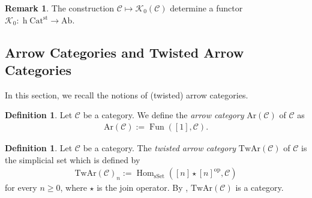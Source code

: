 \documentclass[a4paper,dvipdfmx,11pt,reqno]{amsart}
\DeclareMathOperator{\Hom}{Hom}
\DeclareMathOperator{\Map}{Map}
\DeclareMathOperator{\myop}{op}
\DeclareMathOperator{\h}{h}
\DeclareMathOperator{\Fun}{Fun}
\newcommand{\C}{\mathcal{C}}
\newcommand{\K}{\mathcal{K}}
\newcommand{\An}{\mathrm{An}}
\newcommand{\Catst}{\mathrm{Cat^{st}}}
\newcommand{\Ar}{\mathrm{Ar}}
\newcommand{\TwAr}{\mathrm{TwAr}}
\theoremstyle{definition}
\newtheorem{definition}[theorem]{Definition}
\newtheorem{remark}[theorem]{Remark}
\begin{document}
\begin{remark} \label{Ber.rem.2.5}
  The construction $\C \mapsto \K_0(\C)$ determine a functor $\K_0 : \h\Catst \to \mathrm{Ab}$.
\end{remark}

\subsection{Arrow Categories and Twisted Arrow Categories} 

In this section, we recall the notions of (twisted) arrow categories.

\begin{definition}
  Let $\C$ be a category.
  We define the \textit{arrow category} $\Ar(\C)$ of $\C$ as 
  \begin{align*}
    \Ar(\C) := \Fun([1],\C).
  \end{align*} 
\end{definition}

\begin{definition} \label{Ber.rem.3.1}
  Let $\C$ be a category.
  The \textit{twisted arrow category} $\TwAr(\C)$ of $\C$ is the simplicial set which is defined by 
  \begin{align*}
    \TwAr(\C)_n := \Hom_{\mathrm{sSet}}([n] \star [n]^{\myop},\C)
  \end{align*}
  for every $n \geq 0$, where $\star$ is the join operator.
  By \cite[Proposition 5.2.1.3]{HA}, $\TwAr(\C)$ is a category.
\end{definition}

\end{document}
